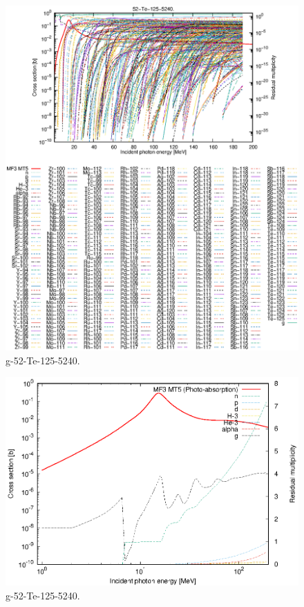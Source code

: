 \begin{figure}
 \includegraphics[width=\linewidth]{eps/g_52-Te-125_5240.eps}
  \caption{g-52-Te-125-5240.}
\end{figure}
\newpage \clearpage

\begin{figure}
 \includegraphics[width=\linewidth]{eps-log/g_52-Te-125_5240.eps}
 \caption{g-52-Te-125-5240.}
\end{figure}
\newpage \clearpage

